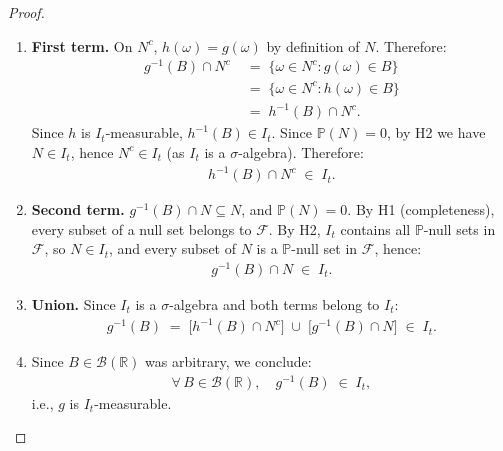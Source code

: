 \documentclass[12pt,openany]{book}
\newcommand{\calI}{\mathcal{I}}
\numberwithin{equation}{chapter}
\theoremstyle{plain}
\theoremstyle{definition}
\theoremstyle{remark}
\numberwithin{equation}{chapter}
\theoremstyle{plain}
\def\calI{I}%
\begin{document}
\begin{proof}
\begin{enumerate}
  \item \textbf{First term.}
        On $N^c$, $h(\omega) = g(\omega)$ by definition of $N$.
        Therefore:
        \begin{align}
          g^{-1}(B) \cap N^c
          &\;=\;
          \{\omega \in N^c : g(\omega) \in B\}
          \\[4pt]
          &\;=\;
          \{\omega \in N^c : h(\omega) \in B\}
          \\[4pt]
          &\;=\;
          h^{-1}(B) \cap N^c.
        \end{align}
        Since $h$ is $\calI_t$-measurable, $h^{-1}(B) \in \calI_t$.
        Since $\mathbb{P}(N) = 0$, by H2 we have $N \in \calI_t$,
        hence $N^c \in \calI_t$ (as $\calI_t$ is a
        $\sigma$-algebra).  Therefore:
        \begin{align}
          h^{-1}(B) \cap N^c \;\in\; \calI_t.
        \end{align}

  \item \textbf{Second term.}
        $g^{-1}(B) \cap N \subseteq N$, and
        $\mathbb{P}(N) = 0$.  By H1 (completeness), every subset
        of a null set belongs to $\mathcal{F}$.  By H2,
        $\calI_t$ contains all $\mathbb{P}$-null sets in
        $\mathcal{F}$, so $N \in \calI_t$, and every subset of
        $N$ is a $\mathbb{P}$-null set in $\mathcal{F}$, hence:
        \begin{align}
          g^{-1}(B) \cap N \;\in\; \calI_t.
        \end{align}

  \item \textbf{Union.}
        Since $\calI_t$ is a $\sigma$-algebra and both terms
        belong to $\calI_t$:
        \begin{align}
          g^{-1}(B)
          \;=\;
          \bigl[h^{-1}(B) \cap N^c\bigr]
          \;\cup\;
          \bigl[g^{-1}(B) \cap N\bigr]
          \;\in\; \calI_t.
        \end{align}

  \item Since $B \in \mathcal{B}(\mathbb{R})$ was arbitrary, we
        conclude:
        \begin{align}
          \forall\, B \in \mathcal{B}(\mathbb{R}),
          \quad
          g^{-1}(B) \;\in\; \calI_t,
        \end{align}
        i.e., $g$ is $\calI_t$-measurable.
\end{enumerate}


\end{proof}
\end{document}
